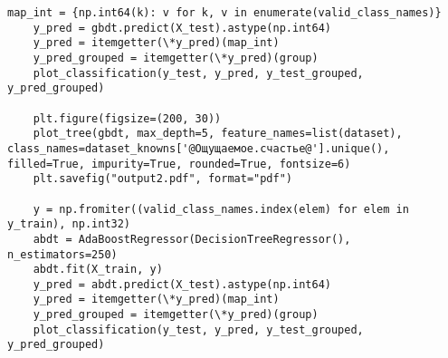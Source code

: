\begin{lstlisting}[label=lst:1,caption=Классификация с использованием дерева решений\, логистической регрессии и ансамблевого классификатора]
	map_int = {np.int64(k): v for k, v in enumerate(valid_class_names)}
	y_pred = gbdt.predict(X_test).astype(np.int64)
	y_pred = itemgetter(\*y_pred)(map_int)
	y_pred_grouped = itemgetter(\*y_pred)(group)
	plot_classification(y_test, y_pred, y_test_grouped, y_pred_grouped)
	
	plt.figure(figsize=(200, 30))
	plot_tree(gbdt, max_depth=5, feature_names=list(dataset), class_names=dataset_knowns['@Ощущаемое.счастье@'].unique(), filled=True, impurity=True, rounded=True, fontsize=6)
	plt.savefig("output2.pdf", format="pdf")
	
	y = np.fromiter((valid_class_names.index(elem) for elem in y_train), np.int32)
	abdt = AdaBoostRegressor(DecisionTreeRegressor(), n_estimators=250)
	abdt.fit(X_train, y)
	y_pred = abdt.predict(X_test).astype(np.int64)
	y_pred = itemgetter(\*y_pred)(map_int)
	y_pred_grouped = itemgetter(\*y_pred)(group)
	plot_classification(y_test, y_pred, y_test_grouped, y_pred_grouped)
\end{lstlisting}

\clearpage
